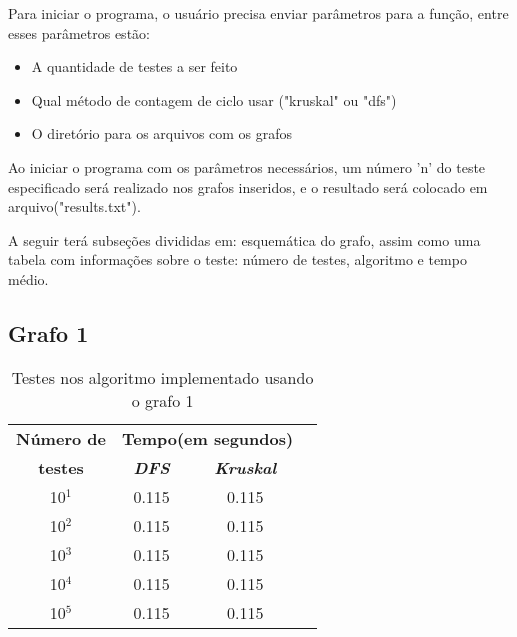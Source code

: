 \documentclass[12pt]{article}
\begin{document}
  Para iniciar o programa, o usuário precisa enviar parâmetros para a função, entre esses parâmetros estão:

  \begin{itemize}
    \item A quantidade de testes a ser feito
    \item Qual método de contagem de ciclo usar ("kruskal" ou "dfs")
    \item O diretório para os arquivos com os grafos
  \end{itemize}

  Ao iniciar o programa com os parâmetros necessários, um número 'n' do teste especificado 
  será realizado nos grafos inseridos, e o resultado será colocado em arquivo("results.txt").
  
  A seguir terá subseções divididas em: esquemática do grafo, assim como 
  uma tabela com informações sobre o teste: número de testes, algoritmo e
  tempo médio.

  \newpage 

  \subsection{Grafo 1}

  \begin{figure}[ht]
    \centering

  \end{figure}

  \begin{table}[htbp]
    \caption{Testes nos algoritmo implementado usando o grafo 1}
    \begin{center}
    \begin{tabular}{|c|c|c|c|}
    \hline
    \textbf{Número de}&\multicolumn{2}{|c|}{\textbf{Tempo(em segundos)}} \\
    \cline{2-3} 
    \textbf{testes} & \textbf{\textit{DFS}}& \textbf{\textit{Kruskal}} \\
    \hline
    10$^{\mathrm{1}}$& 0.115 & 0.115 \\
    \hline
    10$^{\mathrm{2}}$& 0.115 & 0.115 \\
    \hline
    10$^{\mathrm{3}}$& 0.115 & 0.115 \\
    \hline
    10$^{\mathrm{4}}$& 0.115 & 0.115 \\
    \hline
    10$^{\mathrm{5}}$& 0.115 & 0.115 \\
    \hline
    \end{tabular}
    \end{center}
  \end{table}
\end{document}
